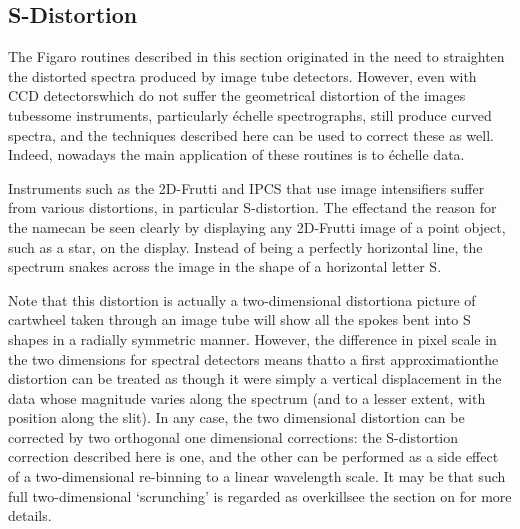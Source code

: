 
\subsection{\label{techno7}S-Distortion}

   The Figaro routines described in this section originated in the need
   to straighten the distorted spectra produced by image tube detectors.
   However, even with CCD detectors\latorhtm{---}{-}which do not suffer the
   geometrical distortion of the images tubes\latorhtm{---}{-}some instruments,
   particularly \'echelle spectrographs, still produce curved spectra, and
   the techniques described here can be used to correct these as well.
   Indeed, nowadays the main application of these routines is to \'echelle
   data.

   Instruments such as the 2D-Frutti and IPCS that use image
   intensifiers suffer from various distortions, in particular
   S-distortion.  The effect\latorhtm{---}{-}and the reason for the
   name\latorhtm{---}{-}can be seen
   clearly by displaying any 2D-Frutti image of a point object, such as
   a star, on the display. Instead of being a perfectly horizontal line,
   the spectrum snakes across the image in the shape of a horizontal
   letter S.

   Note that this distortion is actually a two-dimensional
   distortion\latorhtm{---}{-}a picture of cartwheel taken through an image
   tube will show all the
   spokes bent into S shapes in a radially symmetric manner.  However,
   the difference in pixel scale in the two dimensions for spectral
   detectors means that\latorhtm{---}{-}to a first
   approximation\latorhtm{---}{-}the distortion can
   be treated as though it were simply a vertical displacement in the
   data whose magnitude varies along the spectrum (and to a lesser
   extent, with position along the slit). In any case, the two
   dimensional distortion can be corrected by two orthogonal one
   dimensional corrections: the S-distortion correction described here
   is one, and the other can be performed as a side effect of a
   two-dimensional re-binning to a linear wavelength scale.  It may be
   that such full two-dimensional `scrunching' is regarded as
   overkill\latorhtm{---}{-}see
   {the section on }
   for more details.

